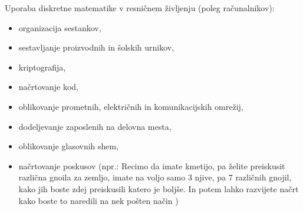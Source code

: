 \documentclass[12pt]{article}
\begin{document}
Uporaba diskretne matematike v resničnem življenju (poleg računalnikov):
\begin{itemize}
    \item organizacija sestankov,
    \item sestavljanje proizvodnih in šolskih urnikov,
    \item kriptografija,
    \item načrtovanje kod,
    \item oblikovanje prometnih, električnih in komunikacijskih omrežij,
    \item dodeljevanje zaposlenih na delovna mesta,
    \item oblikovanje glasovnih shem,
    \item načrtovanje poskusov (npr.: Recimo da imate kmetijo, pa želite preiskusit različna gnoila za zemljo, imate na voljo samo 3 njive, pa 7 različnih gnojil, kako jih boste zdej preiskusili katero je boljše. In potem lahko razvijete načrt kako boste to naredili na nek pošten način )
\end{itemize}
\begin{center}
\end{center}
\end{document}
